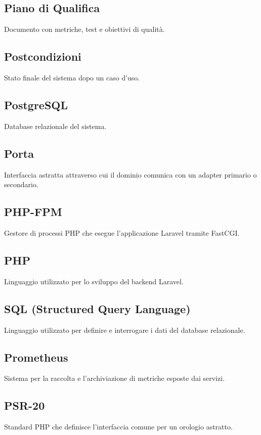 \documentclass[a4paper,12pt]{article}
\begin{document}
\subsection{Piano di Qualifica}
Documento con metriche, test e obiettivi di qualità.


\subsection{Postcondizioni}
Stato finale del sistema dopo un caso d'uso.

\subsection{PostgreSQL}
Database relazionale del sistema.

\subsection{Porta}
Interfaccia astratta attraverso cui il dominio comunica con un adapter primario o secondario.

\subsection{PHP-FPM}
Gestore di processi PHP che esegue l'applicazione Laravel tramite FastCGI.

\subsection{PHP}
Linguaggio utilizzato per lo sviluppo del backend Laravel.

\subsection{SQL (Structured Query Language)}
Linguaggio utilizzato per definire e interrogare i dati del database relazionale.

\subsection{Prometheus}
Sistema per la raccolta e l'archiviazione di metriche esposte dai servizi.

\subsection{PSR-20}
Standard PHP che definisce l'interfaccia comune per un orologio astratto.
\end{document}
